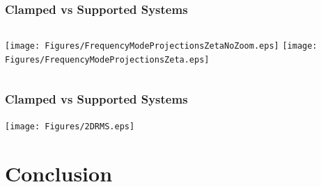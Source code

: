 \documentclass[hyperref={colorlinks=true,urlcolor=blue,linkcolor=.},aspectratio=1610,mathserif]{beamer}
\begin{document}
\begin{frame}
 \frametitle{Clamped vs Supported Systems}
 \begin{columns}[T]
  \texttt{[image: Figures/FrequencyModeProjectionsZetaNoZoom.eps]}
  \texttt{[image: Figures/FrequencyModeProjectionsZeta.eps]}
 \end{columns}
\end{frame}

\begin{frame}
 \frametitle{Clamped vs Supported Systems}
 \begin{center}
  \texttt{[image: Figures/2DRMS.eps]}
 \end{center}
\end{frame}

\section{Conclusion}
\end{document}
